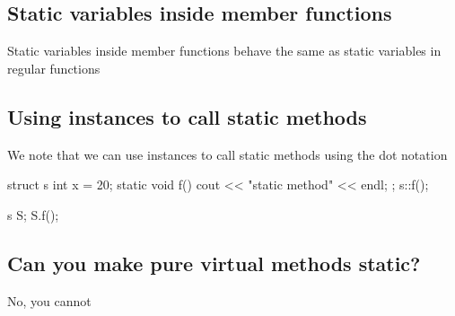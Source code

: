 \documentclass{report}
\begin{document}
    \pagebreak 
    \bigbreak \noindent 
    \subsection{Static variables inside member functions}
    \bigbreak \noindent 
    Static variables inside member functions behave the same as static variables in regular functions
    \bigbreak \noindent 
    \subsection{Using instances to call static methods}
    \bigbreak \noindent 
    We note that we can use instances to call static methods using the dot notation
    \bigbreak \noindent 
    \begin{cppcode}
        struct s{
            int x = 20;
            static void f() {
                cout << "static method" << endl;
            }
        };
        s::f();

        s S;
        S.f();
    \end{cppcode}
    \bigbreak \noindent 
    \subsection{Can you make pure virtual methods static?}
    \bigbreak \noindent 
    No, you cannot

    \bigbreak \noindent 
\end{document}
